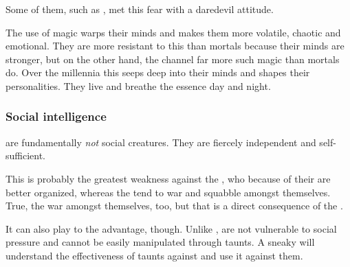 

Some of them, such as \Ishnaruchaefir, met this fear with a  daredevil attitude. 

The \psp{\dragons}{} use of  magic warps their minds and makes them more volatile, chaotic and emotional. 
They are more resistant to this than mortals because their minds are stronger, but on the other hand, the \dragons{} channel far more such magic than mortals do. 
Over the millennia this seeps deep into their minds and shapes their personalities. 
They live and breathe the \xs{} essence day and night. 





\subsubsection{Social intelligence}
\Dragons{} are fundamentally \emph{not} social creatures. 
They are fiercely independent and self-sufficient. 

This is probably the \psp{\dragons}{} greatest weakness against the \resphain, who because of their  are better organized, whereas the \dragons{} tend to war and squabble amongst themselves. 
True, the \resphain{} war amongst themselves, too, but that is a direct consequence of the . 

It can also play to the \psp{\dragons}{} advantage, though. 
Unlike \resphain, \dragons{} are not vulnerable to social pressure and cannot be easily manipulated through taunts. 
A sneaky \dragon{} will understand the effectiveness of taunts against \resphain{} and use it against them. 

